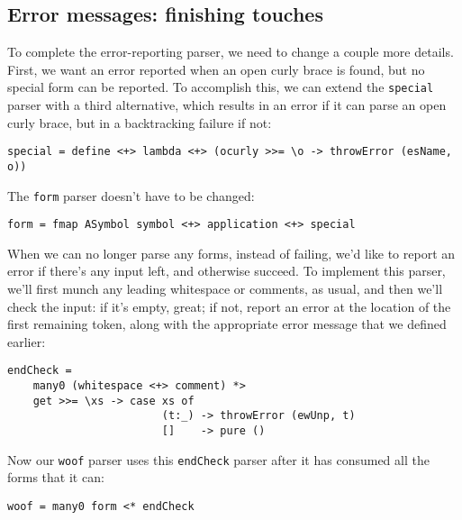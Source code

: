 \documentclass{tmr}
\begin{document}
\subsection{Error messages:  finishing touches}
To complete the error-reporting parser, we need to change a couple more details.  First, we want an error 
reported when an open curly brace is found, but no special form can be reported.  To accomplish this, we
can extend the \verb+special+ parser with a third alternative, which results in an error if it can parse
an open curly brace, but in a backtracking failure if not:
\begin{verbatim}
special = define <+> lambda <+> (ocurly >>= \o -> throwError (esName, o))
\end{verbatim}
The \verb+form+ parser doesn't have to be changed:
\begin{verbatim}
form = fmap ASymbol symbol <+> application <+> special
\end{verbatim}
When we can no longer parse any forms, instead of failing, we'd like to report an error if there's any input
left, and otherwise succeed.  To implement this parser, we'll first munch any leading whitespace or comments, 
as usual, and then we'll check the input:  if it's empty, great; if not, report an error at the location of the
first remaining token, along with the appropriate error message that we defined earlier:
\begin{verbatim}
endCheck = 
    many0 (whitespace <+> comment) *>
    get >>= \xs -> case xs of
                        (t:_) -> throwError (ewUnp, t)
                        []    -> pure ()
\end{verbatim}
Now our \verb+woof+ parser uses this \verb+endCheck+ parser after it has consumed all the forms that it can:
\begin{verbatim}
woof = many0 form <* endCheck
\end{verbatim}
\end{document}
